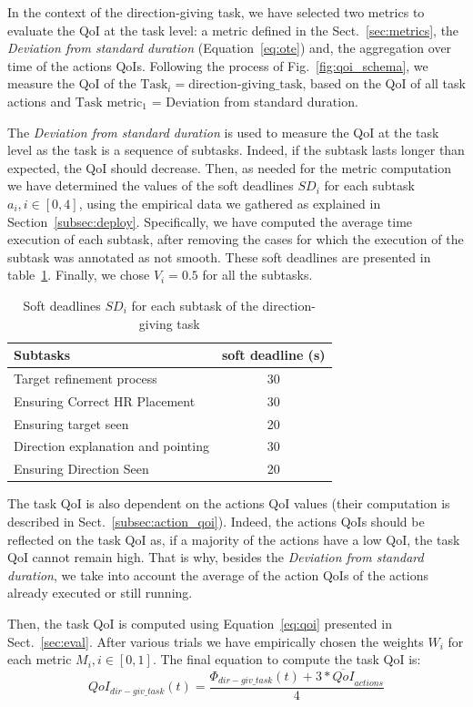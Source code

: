 \documentclass[a4paper,11pt,twoside]{StyleThese}
\begin{document}
In the context of the direction-giving task, we have selected two metrics to evaluate the QoI at the task level: a metric defined in the Sect.~\ref{sec:metrics}, the \emph{Deviation from standard duration} (Equation~\ref{eq:ote}) and, the aggregation over time of the actions QoIs. Following the process of Fig.~\ref{fig:qoi_schema}, we measure the QoI of the $\text{Task}_i = \text{direction-giving\_task}$, based on the QoI of all task actions and $\text{Task metric}_1$ = Deviation from standard duration.

The \emph{Deviation from standard duration} is used to measure the QoI at the task level as the task is a sequence of subtasks. Indeed, if the subtask lasts longer than expected, the QoI should decrease. Then, as needed for the metric computation we have determined the values of the soft deadlines $SD_i$ for each subtask $a_i, i \in [0,4] $, using the empirical data we gathered as explained in Section~\ref{subsec:deploy}. Specifically, we have computed the average time execution of each subtask, after removing the cases for which the execution of the subtask was annotated as not smooth. These soft deadlines are presented in table~\ref{tab:dl}. Finally, we chose $V_i=0.5$ for all the subtasks.
\begin{table}[ht]
	\centering
	\begin{tabular}{l|c}
		\hline
		Subtasks & soft deadline (s) \\ 
		\hline
		Target refinement process &  30 \\ 
		Ensuring Correct HR Placement   & 30 \\ 
		Ensuring target seen  & 20 \\ 
		Direction explanation and pointing & 30 \\
		Ensuring Direction Seen & 20\\
		\hline
	\end{tabular}
	\caption{Soft deadlines $SD_i$ for each subtask of the direction-giving task}
	\label{tab:dl}
\end{table}

The task QoI is also dependent on the actions QoI values (their computation is described in Sect.~\ref{subsec:action_qoi}). Indeed, the actions QoIs should be reflected on the task QoI as, if a majority of the actions have a low QoI, the task QoI cannot remain high. That is why, besides the\emph{ Deviation from standard duration}, we take into account the average of the action QoIs of the actions already executed or still running.

Then, the task QoI is computed using Equation~\eqref{eq:qoi} presented in Sect.~\ref{sec:eval}. After various trials we have empirically chosen the weights $W_i$ for each metric $M_i, i \in [0,1]$. The final equation to compute the task QoI is:
\[QoI_{dir-giv\_task}(t)=\frac{ \Phi_{dir-giv\_task}(t) + 3 * \overline{QoI}_{actions} }{4}\]
\end{document}
